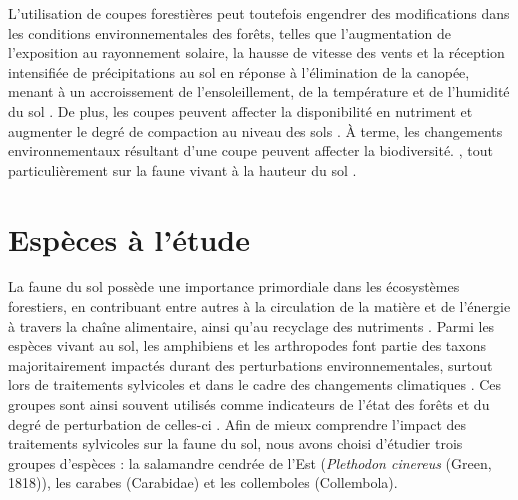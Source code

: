 L'utilisation de coupes forestières peut toutefois engendrer des modifications dans les conditions environnementales des forêts, 
telles que l'augmentation de l'exposition au rayonnement solaire, la hausse de vitesse des vents et la réception intensifiée de précipitations au sol en réponse à l'élimination de la canopée, 
menant à un accroissement de l'ensoleillement, de la température et de l'humidité du sol \citep{Keenan1993ecologicaleffects,Lindo2003Microbialbiomass,Heithecker2007Edgerelatedgradients}.
De plus, les coupes peuvent affecter la disponibilité en nutriment et augmenter le degré de compaction au niveau des sols \citep{Battigelli2004Shorttermimpact,Covington1981Changesforest,Lindo2003Microbialbiomass,rousseauLongtermEffectsBiomass2018}. 
À terme, les changements environnementaux résultant d'une coupe peuvent affecter la biodiversité. \citep{Chaudhary2016Impactforest,Fedrowitz2014Canretention,Paillet2010Biodiversitydifferences}, 
tout particulièrement sur la faune vivant à la hauteur du sol \citep{Chaudhary2016Impactforest,Lindo2003Microbialbiomass,Kudrin2023metaanalysiseffects}.

\section*{Espèces à l'étude}
\label{sec:species}

La faune du sol possède une importance primordiale dans les écosystèmes forestiers, en contribuant entre autres à la circulation de la matière et de l'énergie à travers la chaîne alimentaire, ainsi qu'au recyclage des nutriments \citep{Kudrin2023metaanalysiseffects,Seibold2021contributioninsects}.
Parmi les espèces vivant au sol, les amphibiens et les arthropodes font partie des taxons majoritairement impactés durant des perturbations environnementales, 
surtout lors de traitements sylvicoles \citep{Hartshorn2021reviewforest,Semlitsch2009Effectstimber,Stuart2004Statustrends} et dans le cadre des changements climatiques \citep{Alford1999Globalamphibian,Houlahan2000Quantitativeevidence,Milanovich2010Projectedloss,Parmesan2006EcologicalEvolutionary,Pounds2006Widespreadamphibian,Warren2018projectedeffect}. 
Ces groupes sont ainsi souvent utilisés comme indicateurs de l'état des forêts et du degré de perturbation de celles-ci \citep{birdChangesSoilLitter2004,Maleque2009Arthropodsbioindicators,pongeVerticalDistributionCollembola2000}.
Afin de mieux comprendre l'impact des traitements sylvicoles sur la faune du sol, nous avons choisi d'étudier trois groupes d'espèces : la salamandre cendrée de l'Est (\textit{Plethodon cinereus} (Green, 1818)), 
les carabes (Carabidae) et les collemboles (Collembola).

